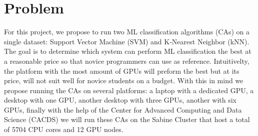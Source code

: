 \section*{Problem}
\label{sec:Problem}

For this project, we propose to run two ML classification algorithms (CAs) on a single dataset: 
Support Vector Machine (SVM) and K-Nearest Neighbor (kNN). 
The goal is to determine which system can perform ML classification the best at a reasonable price 
so that novice programmers can use as reference. Intuitivelty, the 
platform with the most amount of GPUs will preform the best but at its price, will not suit 
well for novice students on a budget. With this in mind we propose running the CAs on several platforms: 
a laptop with a dedicated GPU, a desktop with one GPU, another 
desktop with three GPUs, another with six GPUs, finally with the help of the Center for Advanced 
Computing and Data Science (CACDS) we will run these CAs on the Sabine
Cluster that host a total of 5704 CPU cores and 12 GPU nodes.
